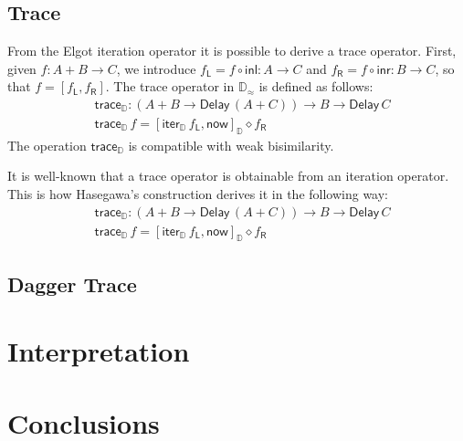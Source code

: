 \documentclass[runningheads]{llncs}
\newcommand{\comp}{\circ}
\newcommand{\inl}{\mathsf{inl}}
\newcommand{\inr}{\mathsf{inr}}
\newcommand{\mapL}[1]{#1_{\mathsf{L}}}
\newcommand{\mapR}[1]{#1_{\mathsf{R}}}
\newcommand{\Delay}{\mathsf{Delay}\,}
\newcommand{\now}{\mathsf{now}}
\newcommand{\D}{\mathbb{D}}
\newcommand{\Dapprox}{\mathbb{D}_{\approx}}
\newcommand{\copairD}[2]{[#1,#2]_{\D}}
\newcommand{\iterD}{\mathsf{iter}_\D}
\newcommand{\traceD}{\mathsf{trace}_\D}
\begin{document}
\subsection{Trace}\label{sec:trace}

From the Elgot iteration operator it is possible to derive a trace
operator. First, given $f : A + B \to C$, we introduce
$\mapL f = f \comp \inl : A \to C$ and
$\mapR f = f \comp \inr : B \to C$, so that $f = [\mapL f , \mapR f]$.
The trace operator in $\Dapprox$ is defined as follows:
\begin{align*}
& \traceD : (A + B \to \Delay (A + C)) \to B \to \Delay C \\
& \traceD \,f = \copairD{\iterD \,\mapL f}{\now} \diamond \mapR f
\end{align*}
The operation $\traceD$ is compatible with weak bisimilarity. 

It is well-known that a trace operator is obtainable from an iteration
operator. This is how Hasegawa's construction  \cite{Hasegwa97} derives it in the following way:
\begin{align*}
& \traceD : (A + B \to \Delay (A + C)) \to B \to \Delay C \\
& \traceD \,f = \copairD{\iterD \,\mapL f}{\now} \diamond \mapR f
\end{align*}


\subsection{Dagger Trace}\label{sec:daggertrace}



\section{Interpretation}\label{sec:interpretation}

\section{Conclusions}


%
%
%
%
%
%


\end{document}
